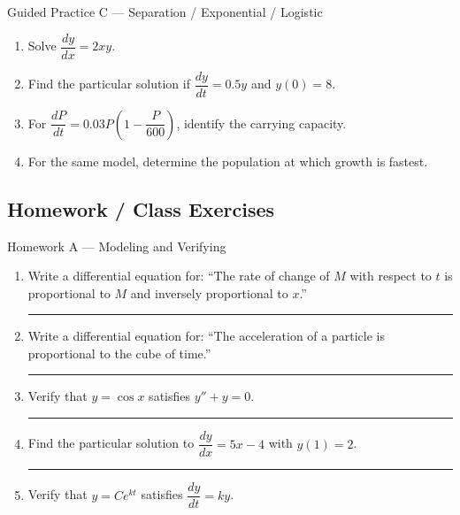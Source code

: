 \documentclass[11pt]{article}
\newcommand{\hwspace}{\vspace{0.8em}\hrule\vspace{0.8em}}
\begin{document}
\begin{practicebox}{Guided Practice C --- Separation / Exponential / Logistic}
\begin{enumerate}
    \item Solve \(\dfrac{dy}{dx}=2xy\).
    \item Find the particular solution if \(\dfrac{dy}{dt}=0.5y\) and \(y(0)=8\).
    \item For \(\dfrac{dP}{dt}=0.03P\left(1-\dfrac{P}{600}\right)\), identify the carrying capacity.
    \item For the same model, determine the population at which growth is fastest.
\end{enumerate}
\end{practicebox}

\newpage
\subsection{Homework / Class Exercises}

\begin{homeworkset}{Homework A --- Modeling and Verifying}
\begin{enumerate}
    \item Write a differential equation for: “The rate of change of \(M\) with respect to \(t\) is proportional to \(M\) and inversely proportional to \(x\).”
    \hwspace

    \item Write a differential equation for: “The acceleration of a particle is proportional to the cube of time.”
    \hwspace

    \item Verify that \(y=\cos x\) satisfies \(y''+y=0\).
    \hwspace

    \item Find the particular solution to \(\dfrac{dy}{dx}=5x-4\) with \(y(1)=2\).
    \hwspace

    \item Verify that \(y=Ce^{kt}\) satisfies \(\dfrac{dy}{dt}=ky\).
\end{enumerate}
\end{homeworkset}
\end{document}
